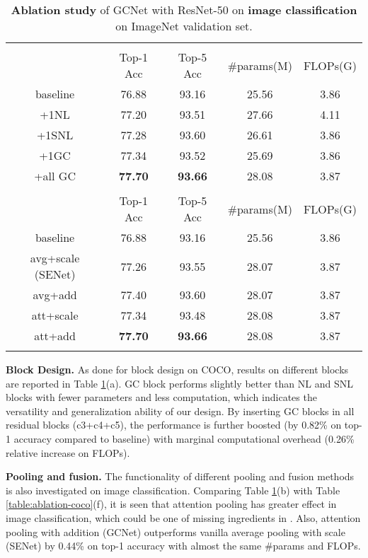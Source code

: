 \documentclass[10pt,twocolumn,letterpaper]{article}
\begin{document}
\begin{table}[]
    \footnotesize
    \centering
    \addtolength{\tabcolsep}{-5pt}
\begin{tabular}{c|cc|c|c}
\Xhline{1.0pt}
\multicolumn{5}{c}{(a) \textbf{Block Design}}                                       \\
 & Top-1 Acc & Top-5 Acc & \#params(M) & FLOPs(G) \\
\hline
baseline & 76.88 & 93.16 & 25.56 & 3.86 \\
+1NL & 77.20 & 93.51 & 27.66 & 4.11 \\
+1SNL & 77.28 & 93.60 & 26.61 & 3.86 \\
+1GC & 77.34 & 93.52 & 25.69 & 3.86 \\
+all GC & \textbf{77.70} & \textbf{93.66} & 28.08 & 3.87 \\
\Xhline{1.0pt}
\multicolumn{5}{c}{(b) \textbf{Pooling and fusion}}                                       \\
 & Top-1 Acc & Top-5 Acc & \#params(M) & FLOPs(G) \\
\hline
baseline & 76.88 & 93.16 & 25.56 & 3.86 \\
avg+scale (SENet) & 77.26 & 93.55 & 28.07 & 3.87 \\
avg+add & 77.40 & 93.60 & 28.07 & 3.87 \\
att+scale & 77.34 & 93.48 & 28.08 & 3.87 \\
att+add & \textbf{77.70} & \textbf{93.66} & 28.08 & 3.87 \\
\Xhline{1.0pt}
\end{tabular}
	\vspace{-8pt}
    \caption{\textbf{Ablation study} of GCNet with ResNet-50 on \textbf{image classification} on {ImageNet} validation set.}
	\label{table:ablation-imagenet}
	\vspace{-10pt}
\end{table}

\textbf{Block Design.}
As done for block design on COCO, results on different blocks are reported in Table \ref{table:ablation-imagenet}(a). 
GC block performs slightly better than NL and SNL blocks with fewer parameters and less computation, which indicates the versatility and generalization ability of our design. 
By inserting GC blocks in all residual blocks (c3+c4+c5), the performance is further boosted (by 0.82\% on top-1 accuracy compared to baseline) with marginal computational overhead (0.26\% relative increase on FLOPs).

\textbf{Pooling and fusion.}
The functionality of different pooling and fusion methods is also investigated on image classification. Comparing Table \ref{table:ablation-imagenet}(b) with Table \ref{table:ablation-coco}(f), it is seen that attention pooling has greater effect in image classification, which could be one of missing ingredients in \cite{hu2018senet}. Also, attention pooling with addition (GCNet) outperforms vanilla average pooling with scale (SENet) by 0.44\% on top-1 accuracy with almost the same \#params and FLOPs. 
\end{document}
